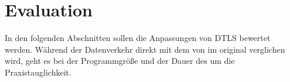 \chapter{Evaluation}

In den folgenden Abschnitten sollen die Anpassungen von DTLS bewertet werden. Während der Datenverkehr direkt mit dem von
 im original verglichen wird, geht es bei der Programmgröße und der Dauer des  um die Praxistauglichkeit.



